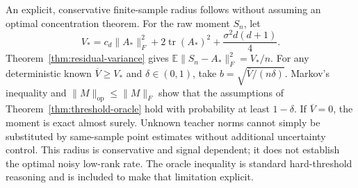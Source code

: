 An explicit, conservative finite-sample radius follows without assuming
an optimal concentration theorem. For the raw moment $S_n$, let
\[
 V_* = c_d\|A_*\|_F^2+2\operatorname{tr}(A_*)^2
                +\frac{\sigma^2d(d+1)}4.
\]
Theorem~\ref{thm:residual-variance} gives
$\mathbb E\|S_n-A_*\|_F^2=V_*/n$. For any deterministic known
$\overline V\geq V_*$ and $\delta\in(0,1)$, take
$b=\sqrt{\overline V/(n\delta)}$. Markov's inequality and
$\|M\|_{\mathrm{op}}\leq\|M\|_F$ show that the assumptions of
Theorem~\ref{thm:threshold-oracle} hold with probability at least
$1-\delta$. If $\overline V=0$, the moment is exact almost surely.
Unknown teacher norms cannot simply be substituted by same-sample point
estimates without additional uncertainty control. This radius is
conservative and signal dependent; it does not establish the optimal
noisy low-rank rate. The oracle inequality is standard hard-threshold
reasoning and is included to make that limitation explicit.

